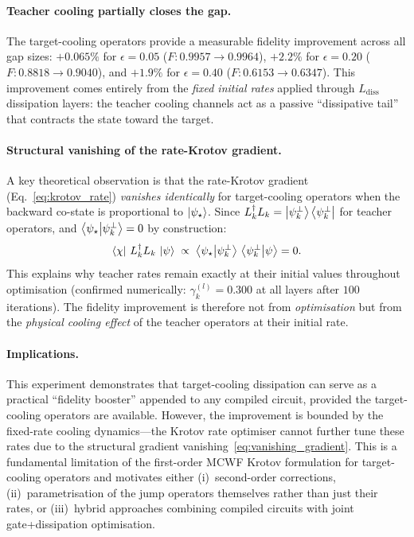 \documentclass[11pt,a4paper]{article}
\begin{document}
\paragraph{Teacher cooling partially closes the gap.}
The target-cooling operators provide a measurable fidelity improvement
across all gap sizes: $+0.065\%$ for $\epsilon = 0.05$
($F: 0.9957 \to 0.9964$), $+2.2\%$ for $\epsilon = 0.20$
($F: 0.8818 \to 0.9040$), and $+1.9\%$ for $\epsilon = 0.40$
($F: 0.6153 \to 0.6347$).  This improvement comes entirely from
the \emph{fixed initial rates} applied through $L_\text{diss}$
dissipation layers: the teacher cooling channels act as a passive
``dissipative tail'' that contracts the state toward the target.

\paragraph{Structural vanishing of the rate-Krotov gradient.}
A key theoretical observation is that the rate-Krotov gradient
(Eq.~\ref{eq:krotov_rate}) \emph{vanishes identically} for
target-cooling operators when the backward co-state is proportional
to $\ket{\psi_\star}$.  Since
$L_k^\dagger L_k = \ket{\psi_k^\perp}\bra{\psi_k^\perp}$ for
teacher operators, and
$\bra{\psi_\star}\ket{\psi_k^\perp} = 0$ by construction:
\begin{equation}
\bra{\chi}\, L_k^\dagger L_k\, \ket{\psi} \;\propto\;
\bra{\psi_\star}\ket{\psi_k^\perp}\,
\bra{\psi_k^\perp}\ket{\psi} = 0.
\label{eq:vanishing_gradient}
\end{equation}
This explains why teacher rates remain exactly at their initial
values throughout optimisation (confirmed numerically:
$\gamma_k^{(l)} = 0.300$ at all layers after $100$ iterations).
The fidelity improvement is therefore not from \emph{optimisation}
but from the \emph{physical cooling effect} of the teacher operators
at their initial rate.

\paragraph{Implications.}
This experiment demonstrates that target-cooling dissipation can serve
as a practical ``fidelity booster'' appended to any compiled circuit,
provided the target-cooling operators are available.  However, the
improvement is bounded by the fixed-rate cooling dynamics---the Krotov
rate optimiser cannot further tune these rates due to the structural
gradient vanishing~\eqref{eq:vanishing_gradient}.  This is a
fundamental limitation of the first-order MCWF Krotov formulation for
target-cooling operators and motivates either (i)~second-order
corrections, (ii)~parametrisation of the jump operators themselves
rather than just their rates, or (iii)~hybrid approaches combining
compiled circuits with joint gate+dissipation optimisation.
\end{document}
